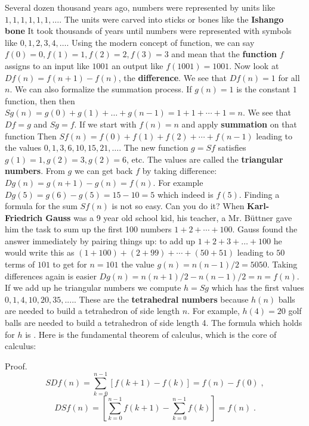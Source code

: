 \documentclass[12pt]{amsart}
\newcounter{example}    \def\example#1{ \item \fontsize{12}{15} \selectfont #1 \fontsize{12}{15} \selectfont }
\begin{document}
Several dozen thousand years ago, numbers were represented by units like
$1,1,1,1,1,1, \dots $. The units were carved into sticks or bones like the {\bf Ishango bone}
It took thousands of years until numbers were represented with symbols like 
$0,1,2,3,4, \dots $. Using the modern concept of function, we can say
$f(0)=0,f(1)=1, f(2)=2, f(3)=3$ and mean that the {\bf function} $f$ assigns to an input like
$1001$ an output like $f(1001)=1001$. Now look at $Df(n) = f(n+1)-f(n)$, the {\bf difference}.
We see that $Df(n) = 1$ for all $n$. We can also formalize the summation process. 
If $g(n) = 1$ is the constant $1$ function, then then 
$Sg(n) = g(0) + g(1) + \dots + g(n-1) = 1+1+\cdots +1 = n$. We see that $Df=g$ and $Sg=f$. 
If we start with $f(n)=n$ and apply {\bf summation} on that function
Then $Sf(n) = f(0) + f(1) + f(2) + \cdots + f(n-1)$ leading to the 
values $0,1,3,6,10,15,21, \dots$. The new function $g=Sf$ satisfies 
$g(1)=1,g(2)=3,g(2)=6$, etc. The values are called the 
{\bf triangular numbers}. From $g$ we can get back $f$ by taking difference:
$Dg(n) = g(n+1)-g(n)=f(n)$. For example $Dg(5) = g(6)-g(5) = 15-10 = 5$ which indeed is $f(5)$.
Finding a formula for the sum $Sf(n)$ is not so easy. Can you do it? 
When {\bf Karl-Friedrich Gauss} was a 9 year old school kid,
his teacher, a Mr. B\"uttner gave him the task to sum up the first 100 numbers $1+2+ \cdots + 100$.
Gauss found the answer immediately by pairing things up:
to add up $1+2+3+ \dots +100$ he would write this as $(1+100) + (2+99) + \cdots + (50+51) $ leading to 
$50$ terms of $101$ to get for $n=101$ the value $g(n)=n(n-1)/2 = 5050$. 
Taking differences again is easier $Dg(n) = n(n+1)/2 - n(n-1)/2 = n = f(n)$. 
If we add up he triangular numbers we compute $h=Sg$ which has the first values
$0,1,4,10,20,35, ....$. These are the {\bf tetrahedral numbers} because $h(n)$ balls  are needed
to build a tetrahedron of side length $n$. For example, $h(4)=20$ golf balls are needed to build a 
tetrahedron of side length 4. The formula which holds for $h$ is . 
Here is the fundamental theorem of calculus, which is the core of calculus: 

\begin{center}
\end{center}

Proof.
$$ SDf(n) =  \sum_{k=0}^{n-1} [f(k+1)-f(k) ]     = f(n)-f(0) \; ,  $$
$$ DSf(n) = [\sum_{k=0}^{n-1} f(k+1)  - \sum_{k=0}^{n-1} f(k) ] = f(n) \; . $$
\end{document}
